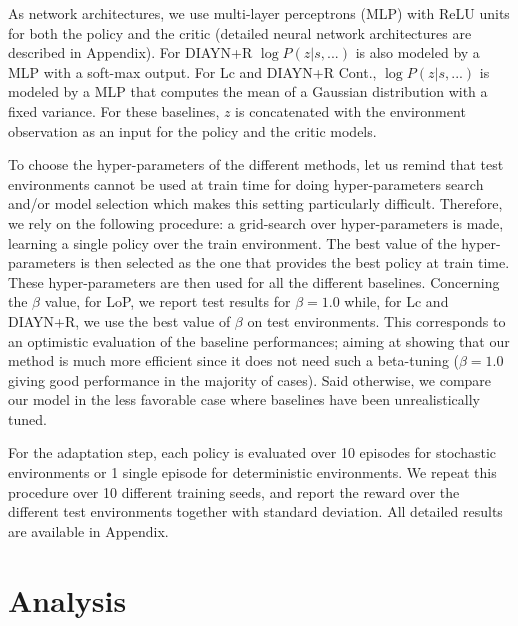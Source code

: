 As network architectures, we use multi-layer perceptrons (MLP) with ReLU units for both the policy and the critic (detailed neural network architectures are described in Appendix). For DIAYN+R $\log P(z|s,...)$ is also modeled by a MLP with a soft-max output. For Lc and DIAYN+R Cont., $\log P(z|s,...)$ is modeled by a MLP that computes the mean of a Gaussian distribution with a fixed variance. For these baselines, $z$ is concatenated with the environment observation as an input for the policy and the critic models.

To choose the hyper-parameters of the different methods, let us remind that test environments cannot be used at train time for doing hyper-parameters search and/or model selection which makes this setting particularly difficult. Therefore, we rely on the following procedure:  a grid-search over hyper-parameters is made, learning a single policy over the train environment. The best value of the hyper-parameters is then selected as the one that provides the best policy at train time. These hyper-parameters are then used for all the different baselines. 
Concerning the $\beta$ value, for LoP, we report test results for $\beta=1.0$ while, for Lc and DIAYN+R, we use the best value of $\beta$ on test environments. This corresponds to an optimistic evaluation of the baseline performances; aiming at showing that our method is much more efficient since it does not need such a beta-tuning ($\beta=1.0$ giving good performance in the majority of cases). Said otherwise, we compare our model in the less favorable case where baselines have been unrealistically tuned.

For the adaptation step, each policy is evaluated over 10 episodes for stochastic environments or 1 single episode for deterministic environments. We repeat this procedure over 10 different training seeds, and report the reward over the different test environments together with standard deviation. All detailed results are available in Appendix. 

\vspace{-0.2cm}
\section{Analysis}
\label{sec:res}
\vspace{-0.3cm}
\begin{table}[t!]

\label{fig:main_results}
\end{table}


